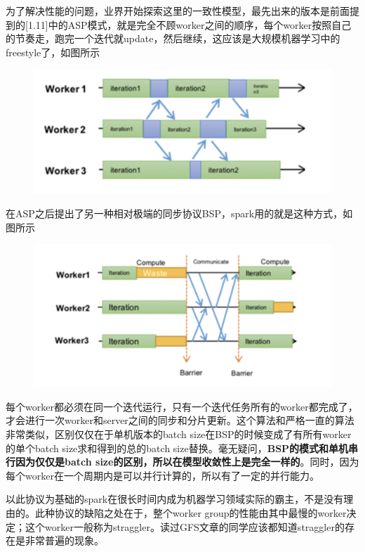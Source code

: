 \documentclass[12pt]{article}
\begin{document}
为了解决性能的问题，业界开始探索这里的一致性模型，最先出来的版本是前面提到的[1.11]中的ASP模式，就是完全不顾worker之间的顺序，每个worker按照自己的节奏走，跑完一个迭代就update，然后继续，这应该是大规模机器学习中的freestyle了，如图所示
\begin{figure}[H]
    \centering
    \includegraphics[width=1\textwidth]{fig/Large_Scale_Synchronize_ASP.png}
\end{figure}

在ASP之后提出了另一种相对极端的同步协议BSP，spark用的就是这种方式，如图所示
\begin{figure}[H]
    \centering
    \includegraphics[width=1\textwidth]{fig/Large_Scale_Synchronize_BSP.png}
\end{figure}
每个worker都必须在同一个迭代运行，只有一个迭代任务所有的worker都完成了，才会进行一次worker和server之间的同步和分片更新。这个算法和严格一直的算法非常类似，区别仅仅在于单机版本的batch size在BSP的时候变成了有所有worker的单个batch size求和得到的总的batch size替换。毫无疑问，\textbf{BSP的模式和单机串行因为仅仅是batch size的区别，所以在模型收敛性上是完全一样的}。同时，因为每个worker在一个周期内是可以并行计算的，所以有了一定的并行能力。

以此协议为基础的spark在很长时间内成为机器学习领域实际的霸主，不是没有理由的。此种协议的缺陷之处在于，整个worker group的性能由其中最慢的worker决定；这个worker一般称为straggler。读过GFS文章的同学应该都知道straggler的存在是非常普遍的现象。
\end{document}

